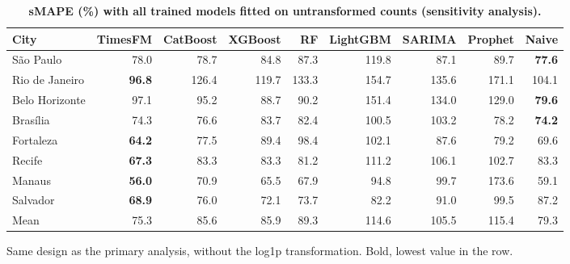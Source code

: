 \documentclass[10pt,letterpaper]{article}
\begin{document}
\begin{table}[!ht]
\centering
\small
\caption{\textbf{sMAPE (\%) with all trained models fitted on untransformed counts (sensitivity analysis).}}
\begin{tabular}{lrrrrrrrr}
\toprule
City & TimesFM & CatBoost & XGBoost & RF & LightGBM & SARIMA & Prophet & Naive \\
\midrule
S\~ao Paulo & 78.0 & 78.7 & 84.8 & 87.3 & 119.8 & 87.1 & 89.7 & \textbf{77.6} \\
Rio de Janeiro & \textbf{96.8} & 126.4 & 119.7 & 133.3 & 154.7 & 135.6 & 171.1 & 104.1 \\
Belo Horizonte & 97.1 & 95.2 & 88.7 & 90.2 & 151.4 & 134.0 & 129.0 & \textbf{79.6} \\
Bras\'ilia & 74.3 & 76.6 & 83.7 & 82.4 & 100.5 & 103.2 & 78.2 & \textbf{74.2} \\
Fortaleza & \textbf{64.2} & 77.5 & 89.4 & 98.4 & 102.1 & 87.6 & 79.2 & 69.6 \\
Recife & \textbf{67.3} & 83.3 & 83.3 & 81.2 & 111.2 & 106.1 & 102.7 & 83.3 \\
Manaus & \textbf{56.0} & 70.9 & 65.5 & 67.9 & 94.8 & 99.7 & 173.6 & 59.1 \\
Salvador & \textbf{68.9} & 76.0 & 72.1 & 73.7 & 82.2 & 91.0 & 99.5 & 87.2 \\
\midrule
Mean & 75.3 & 85.6 & 85.9 & 89.3 & 114.6 & 105.5 & 115.4 & 79.3 \\
\bottomrule
\end{tabular}
\begin{flushleft} Same design as the primary analysis, without the log1p transformation. Bold, lowest value in the row.
\end{flushleft}
\label{tabD}
\end{table}


\end{document}
